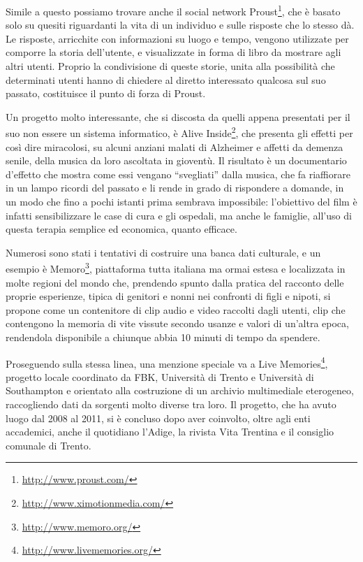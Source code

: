 \documentclass[sigproc-sp.tex]{subfiles}
\begin{document}
Simile a questo possiamo trovare anche il social network Proust\footnote{\url{http://www.proust.com/}}, che è basato solo su quesiti riguardanti la vita di un individuo e sulle risposte che lo stesso dà. Le risposte, arricchite con informazioni su luogo e tempo, vengono utilizzate per comporre la storia dell’utente, e visualizzate in forma di libro da mostrare agli altri utenti. Proprio la condivisione di queste storie, unita alla possibilità che determinati utenti hanno di chiedere al diretto interessato qualcosa sul suo passato, costituisce il punto di forza di Proust.

Un progetto molto interessante, che si discosta da quelli appena presentati per il suo non essere un sistema informatico, è Alive Inside\footnote{\url{http://www.ximotionmedia.com/}}, che presenta gli effetti per così dire miracolosi, su alcuni anziani malati di Alzheimer e affetti da demenza senile, della musica da loro ascoltata in gioventù. Il risultato è un documentario d’effetto che mostra come essi vengano “svegliati” dalla musica, che fa riaffiorare in un lampo ricordi del passato e li rende in grado di rispondere a domande, in un modo che fino a pochi istanti prima sembrava impossibile: l’obiettivo del film è infatti sensibilizzare le case di cura e gli ospedali, ma anche le famiglie, all’uso di questa terapia semplice ed economica, quanto efficace.

Numerosi sono stati i tentativi di costruire una banca dati culturale, e un esempio è Memoro\footnote{\url{http://www.memoro.org/}}, piattaforma tutta italiana ma ormai estesa e localizzata in molte regioni del mondo che, prendendo spunto dalla pratica del racconto delle proprie esperienze, tipica di genitori e nonni nei confronti di figli e nipoti, si propone come un contenitore di clip audio e video raccolti dagli utenti, clip che contengono la memoria di vite vissute secondo usanze e valori di un'altra epoca, rendendola disponibile a chiunque abbia 10 minuti di tempo da spendere.

Proseguendo sulla stessa linea, una menzione speciale va a Live Memories\footnote{\url{http://www.livememories.org/}}, progetto locale coordinato da FBK, Università di Trento e Università di Southampton e orientato alla costruzione di un archivio multimediale eterogeneo, raccogliendo dati da sorgenti molto diverse tra loro. Il progetto, che ha avuto luogo dal 2008 al 2011, si è concluso dopo aver coinvolto, oltre agli enti accademici, anche il quotidiano l’Adige, la rivista Vita Trentina e il consiglio comunale di Trento.
\end{document}

